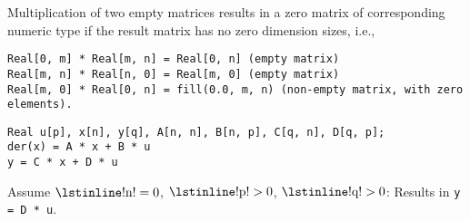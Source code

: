 Multiplication of two empty matrices results in a zero matrix of corresponding numeric type if the result matrix has no zero dimension sizes, i.e.,
\begin{lstlisting}[language=modelica]
Real[0, m] * Real[m, n] = Real[0, n] (empty matrix)
Real[m, n] * Real[n, 0] = Real[m, 0] (empty matrix)
Real[m, 0] * Real[0, n] = fill(0.0, m, n) (non-empty matrix, with zero elements).
\end{lstlisting}

\begin{example}
\begin{lstlisting}[language=modelica]
Real u[p], x[n], y[q], A[n, n], B[n, p], C[q, n], D[q, p];
der(x) = A * x + B * u
y = C * x + D * u
\end{lstlisting}
Assume $\text{\lstinline!n!} = 0$, $\text{\lstinline!p!} > 0$, $\text{\lstinline!q!} > 0$: Results in \lstinline!y = D * u!.
\end{example}
